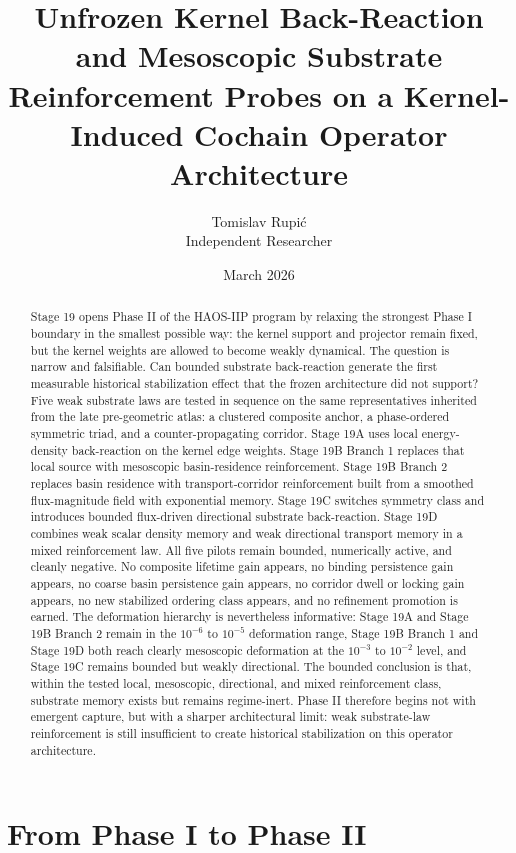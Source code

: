 \documentclass[11pt]{article}
\title{Unfrozen Kernel Back-Reaction and Mesoscopic Substrate Reinforcement Probes on a Kernel-Induced Cochain Operator Architecture}
\author{Tomislav Rupi\'c \\ Independent Researcher}
\date{March 2026}
\begin{document}
\maketitle

\begin{abstract}
Stage 19 opens Phase II of the HAOS-IIP program by relaxing the strongest Phase I boundary in the smallest possible way: the kernel support and projector remain fixed, but the kernel weights are allowed to become weakly dynamical. The question is narrow and falsifiable. Can bounded substrate back-reaction generate the first measurable historical stabilization effect that the frozen architecture did not support? Five weak substrate laws are tested in sequence on the same representatives inherited from the late pre-geometric atlas: a clustered composite anchor, a phase-ordered symmetric triad, and a counter-propagating corridor. Stage 19A uses local energy-density back-reaction on the kernel edge weights. Stage 19B Branch 1 replaces that local source with mesoscopic basin-residence reinforcement. Stage 19B Branch 2 replaces basin residence with transport-corridor reinforcement built from a smoothed flux-magnitude field with exponential memory. Stage 19C switches symmetry class and introduces bounded flux-driven directional substrate back-reaction. Stage 19D combines weak scalar density memory and weak directional transport memory in a mixed reinforcement law. All five pilots remain bounded, numerically active, and cleanly negative. No composite lifetime gain appears, no binding persistence gain appears, no coarse basin persistence gain appears, no corridor dwell or locking gain appears, no new stabilized ordering class appears, and no refinement promotion is earned. The deformation hierarchy is nevertheless informative: Stage 19A and Stage 19B Branch 2 remain in the $10^{-6}$ to $10^{-5}$ deformation range, Stage 19B Branch 1 and Stage 19D both reach clearly mesoscopic deformation at the $10^{-3}$ to $10^{-2}$ level, and Stage 19C remains bounded but weakly directional. The bounded conclusion is that, within the tested local, mesoscopic, directional, and mixed reinforcement class, substrate memory exists but remains regime-inert. Phase II therefore begins not with emergent capture, but with a sharper architectural limit: weak substrate-law reinforcement is still insufficient to create historical stabilization on this operator architecture.
\end{abstract}

\section{From Phase I to Phase II}
\end{document}
